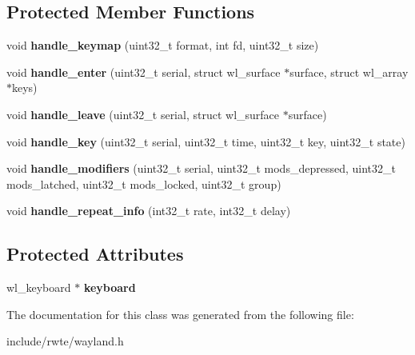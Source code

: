 \subsection*{Protected Member Functions}
\begin{DoxyCompactItemize}
\item 
\mbox{\label{classwayland_1_1Keyboard_a5311683c74b178a3a7c2c4fc680060f0}} 
void {\bfseries handle\+\_\+keymap} (uint32\+\_\+t format, int fd, uint32\+\_\+t size)
\item 
\mbox{\label{classwayland_1_1Keyboard_a1cce92fa259fd996886c0f9ed258d49e}} 
void {\bfseries handle\+\_\+enter} (uint32\+\_\+t serial, struct wl\+\_\+surface $\ast$surface, struct wl\+\_\+array $\ast$keys)
\item 
\mbox{\label{classwayland_1_1Keyboard_a974d84b88b60dedff790da589a5652eb}} 
void {\bfseries handle\+\_\+leave} (uint32\+\_\+t serial, struct wl\+\_\+surface $\ast$surface)
\item 
\mbox{\label{classwayland_1_1Keyboard_ad21893bd390a7840a15c4aaa510331bf}} 
void {\bfseries handle\+\_\+key} (uint32\+\_\+t serial, uint32\+\_\+t time, uint32\+\_\+t key, uint32\+\_\+t state)
\item 
\mbox{\label{classwayland_1_1Keyboard_ae0ff5ad062208af9b94638a3c9fb75be}} 
void {\bfseries handle\+\_\+modifiers} (uint32\+\_\+t serial, uint32\+\_\+t mods\+\_\+depressed, uint32\+\_\+t mods\+\_\+latched, uint32\+\_\+t mods\+\_\+locked, uint32\+\_\+t group)
\item 
\mbox{\label{classwayland_1_1Keyboard_ae21f4ba447ca872e87b4bef34036033c}} 
void {\bfseries handle\+\_\+repeat\+\_\+info} (int32\+\_\+t rate, int32\+\_\+t delay)
\end{DoxyCompactItemize}
\subsection*{Protected Attributes}
\begin{DoxyCompactItemize}
\item 
\mbox{\label{classwayland_1_1Keyboard_adc71727e892c52650eb4ba8e5f0fe3aa}} 
wl\+\_\+keyboard $\ast$ {\bfseries keyboard}
\end{DoxyCompactItemize}


The documentation for this class was generated from the following file\+:\begin{DoxyCompactItemize}
\item 
include/rwte/wayland.\+h\end{DoxyCompactItemize}
